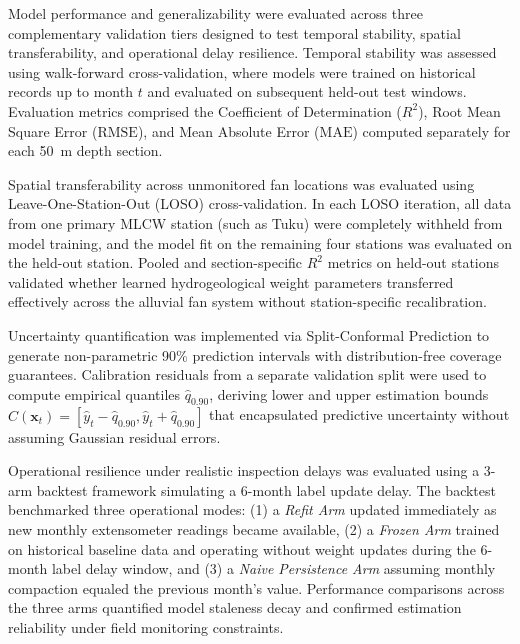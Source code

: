 Model performance and generalizability were evaluated across three complementary validation tiers designed to test temporal stability, spatial transferability, and operational delay resilience. Temporal stability was assessed using walk-forward cross-validation, where models were trained on historical records up to month $t$ and evaluated on subsequent held-out test windows. Evaluation metrics comprised the Coefficient of Determination ($R^2$), Root Mean Square Error ($\text{RMSE}$), and Mean Absolute Error ($\text{MAE}$) computed separately for each 50~m depth section.

Spatial transferability across unmonitored fan locations was evaluated using Leave-One-Station-Out (LOSO) cross-validation. In each LOSO iteration, all data from one primary MLCW station (such as Tuku) were completely withheld from model training, and the model fit on the remaining four stations was evaluated on the held-out station. Pooled and section-specific $R^2$ metrics on held-out stations validated whether learned hydrogeological weight parameters transferred effectively across the alluvial fan system without station-specific recalibration.

Uncertainty quantification was implemented via Split-Conformal Prediction to generate non-parametric 90\% prediction intervals with distribution-free coverage guarantees. Calibration residuals from a separate validation split were used to compute empirical quantiles $\hat{q}_{0.90}$, deriving lower and upper estimation bounds $\hat{C}(\mathbf{x}_t) = [\hat{y}_t - \hat{q}_{0.90}, \hat{y}_t + \hat{q}_{0.90}]$ that encapsulated predictive uncertainty without assuming Gaussian residual errors.

Operational resilience under realistic inspection delays was evaluated using a 3-arm backtest framework simulating a 6-month label update delay. The backtest benchmarked three operational modes: (1) a \textit{Refit Arm} updated immediately as new monthly extensometer readings became available, (2) a \textit{Frozen Arm} trained on historical baseline data and operating without weight updates during the 6-month label delay window, and (3) a \textit{Naive Persistence Arm} assuming monthly compaction equaled the previous month's value. Performance comparisons across the three arms quantified model staleness decay and confirmed estimation reliability under field monitoring constraints.